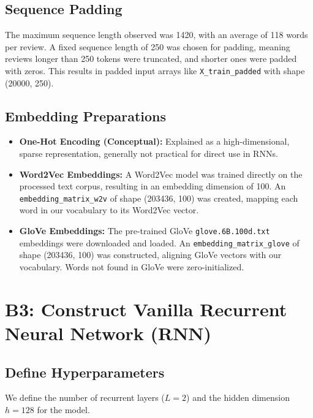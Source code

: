 \documentclass{article}
\begin{document}
\subsection*{Sequence Padding}
The maximum sequence length observed was 1420, with an average of 118 words per review. A fixed sequence length of 250 was chosen for padding, meaning reviews longer than 250 tokens were truncated, and shorter ones were padded with zeros. This results in padded input arrays like \texttt{X\_train\_padded} with shape (20000, 250).

\subsection*{Embedding Preparations}
\begin{itemize}
    \item \textbf{One-Hot Encoding (Conceptual):} Explained as a high-dimensional, sparse representation, generally not practical for direct use in RNNs.
    \item \textbf{Word2Vec Embeddings:} A Word2Vec model was trained directly on the processed text corpus, resulting in an embedding dimension of 100. An \texttt{embedding\_matrix\_w2v} of shape (203436, 100) was created, mapping each word in our vocabulary to its Word2Vec vector.
    \item \textbf{GloVe Embeddings:} The pre-trained GloVe \texttt{glove.6B.100d.txt} embeddings were downloaded and loaded. An \texttt{embedding\_matrix\_glove} of shape (203436, 100) was constructed, aligning GloVe vectors with our vocabulary. Words not found in GloVe were zero-initialized.
\end{itemize}

\section{B3: Construct Vanilla Recurrent Neural Network (RNN)}

\subsection*{Define Hyperparameters}
We define the number of recurrent layers ($L=2$) and the hidden dimension $h=128$ for the model.
\end{document}
